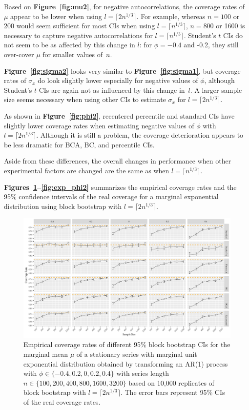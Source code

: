 \documentclass[10pt]{article}
\begin{document}
Based on \textbf{Figure~\ref{fig:mu2}}, for negative autocorrelations, the 
coverage 
rates of $\mu$ appear to be lower when
using $l = \lceil 2n^{1/3} \rceil$. For example, whereas $n = 100$ or 200 
would seem sufficient for most CIs when using $l = \lceil n^{1/3} \rceil$, 
$n = 800$ or 1600 is necessary to capture negative autocorrelations for 
$l = \lceil n^{1/3} \rceil$. Student's $t$ CIs do not seem to be as affected
by this change in $l$: for $\phi = -0.4$ and -0.2, they still over-cover $\mu$
for smaller values of~$n$. 

\textbf{Figure~\ref{fig:sigma2}} looks very similar to 
\textbf{Figure~\ref{fig:sigma1}}, but coverage rates of $\sigma_x$ do look 
slightly lower
especially for negative values of $\phi$, although Student's $t$ CIs are again
not as influenced by this change in~$l$. A larger sample size seems necessary
when using other CIs to estimate $\sigma_x$ for $l = \lceil 2n^{1/3} \rceil$.

As shown in \textbf{Figure~\ref{fig:phi2}},
recentered percentile and standard CIs have slightly lower coverage rates when
estimating negative values of $\phi$ with $l = \lceil 2n^{1/3} \rceil$. 
Although it is still a problem, the coverage deterioration appears to be less 
dramatic for BCA,
BC, and percentile CIs.

Aside from these differences, the overall changes
in performance when other experimental factors are changed are the same as
when $l = \lceil n^{1/3} \rceil$.

\textbf{Figures~\ref{fig:exp_mu2}--\ref{fig:exp_phi2}} 
summarizes the empirical coverage rates and the 95\% confidence intervals of the 
real coverage for a marginal exponential distribution using block bootstrap
with $l = \lceil 2n^{1/3} \rceil$.

\begin{figure}[tbp]
  \centering
  \includegraphics[width=\textwidth]{figures/plot_exp_mu_2}
  \caption{Empirical coverage rates of different 95\% block bootstrap CIs for
    the marginal mean $\mu$ of a stationary series with marginal unit exponential
    distribution obtained by transforming an AR(1) process with
    $\phi \in \{-0.4, 0.2, 0, 0.2, 0.4\}$ with series length
    $n \in \{100, 200, 400, 800, 1600, 3200\}$ based on 10,000 replicates of
    block bootstrap with $l = \lceil 2n^{1/3} \rceil$. 
    The error bars represent 95\% CIs of the real coverage rates.}
  \label{fig:exp_mu2}
\end{figure}
\end{document}
